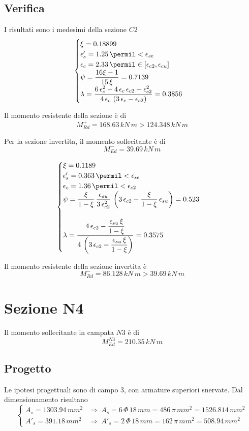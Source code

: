 \subsection{Verifica}
I risultati sono i medesimi della sezione $C2$
\[
\begin{cases}
	\xi = 0.18899\\
	\epsilon'_s = 1.25\,\permil < \epsilon_{se}\\
	\epsilon_c = 2.33\,\permil \in \left[\epsilon_{c2}, \epsilon_{cu}\right]\\
	\psi = \dfrac{16\xi -1}{15\,\xi} = 0.7139 \\
	\lambda = \dfrac{6\,\epsilon_{c}^2 - 4\,\epsilon_{c}\,\epsilon_{c2} + \epsilon_{c2}^2}{4\,\epsilon_{c}\,\left(3\,\epsilon_c - \epsilon_{c2}\right)} = 0.3856
\end{cases}
\]

Il momento resistente della sezione è di
\[
M_{Rd}^+ = 168.63\,kN\,m > 124.348\,kN\,m
\]

Per la sezione invertita, il momento sollecitante è di 
\[
 M_{Ed}^{-} = 39.69\,kN\,m
\]

\[
\begin{cases}
	\xi = 0.1189\\
	\epsilon'_s = 0.363\,\permil<\epsilon_{se}\\
	\epsilon_c = 1.36\,\permil < \epsilon_{c2}\\
	\psi = \dfrac{\xi}{1-\xi}\,\dfrac{\epsilon_{su}}{3\,\epsilon_{c2}^2}\,\left(3\,\epsilon_{c2} - \dfrac{\xi}{1-\xi}\,\epsilon_{su}\right) = 0.523\\\\
	\lambda = \dfrac{4\,\epsilon_{c2} - \dfrac{\epsilon_{su}\,\xi}{1-\xi}}{4\,\left(3\,\epsilon_{c2} - \dfrac{\epsilon_{su}\,\xi}{1-\xi}\right)} = 0.3575
\end{cases}
\]

Il momento resistente della sezione invertita è
\[
M_{Rd}^- = 86.128\,kN\,m > 39.69\,kN\,m
\]

\section{Sezione N4}
Il momento sollecitante in campata $N3$ è di 
\[
M_{Ed}^{N3} = 210.35\,kN\,m
\]
\subsection{Progetto}
Le ipotesi progettuali sono di campo 3, con armature superiori snervate. Dal dimensionamento risultano
\[
\begin{cases}
	A_s = 1303.94\,mm^2 &\Longrightarrow~A_s = 6\,\Phi\,18\,mm = 486\,\pi\,mm^2 = 1526.814\,mm^2\\
	A'_s = 391.18\,mm^2 &\Longrightarrow~ A'_s = 2\,\Phi\,18\,mm = 162\,\pi\,mm^2 = 508.94\,mm^2
\end{cases}
\]

